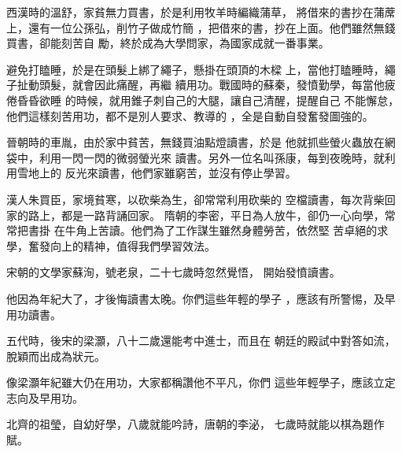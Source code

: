 \documentclass[avery5371,grid]{flashcards}
\begin{document}
{西漢時的溫舒，家貧無力買書，於是利用牧羊時編織蒲草，
將借來的書抄在蒲蓆上，還有一位公孫弘，削竹子做成竹簡
，把借來的書，抄在上面。他們雖然無錢買書，卻能刻苦自
勵，終於成為大學問家，為國家成就一番事業。} %
{} %

{避免打瞌睡，於是在頭髮上綁了繩子，懸掛在頭頂的木樑
上，當他打瞌睡時，繩子扯動頭髮，就會因此痛醒，再繼
續用功。戰國時的蘇秦，發憤勤學，每當他疲倦昏昏欲睡
的時候，就用錐子刺自己的大腿，讓自己清醒，提醒自己
不能懈怠，他們這樣刻苦用功，都不是別人要求、教導的
，全是自動自發奮發圖強的。} %
{} %

{晉朝時的車胤，由於家中貧苦，無錢買油點燈讀書，於是
他就抓些螢火蟲放在網袋中，利用一閃一閃的微弱螢光來
讀書。另外一位名叫孫康，每到夜晚時，就利用雪地上的
反光來讀書，他們家雖窮苦，並沒有停止學習。} %
{} %






{漢人朱買臣，家境貧寒，以砍柴為生，卻常常利用砍柴的
空檔讀書，每次背柴回家的路上，都是一路背誦回家。
隋朝的李密，平日為人放牛，卻仍一心向學，常常把書掛
在牛角上苦讀。他們為了工作謀生雖然身體勞苦，依然堅
苦卓絕的求學，奮發向上的精神，值得我們學習效法。} %
{} %

{宋朝的文學家蘇洵，號老泉，二十七歲時忽然覺悟，
開始發憤讀書。} %
{} %

{他因為年紀大了，才後悔讀書太晚。你們這些年輕的學子
，應該有所警惕，及早用功讀書。} %
{} %

{五代時，後宋的梁灝，八十二歲還能考中進士，而且在
朝廷的殿試中對答如流，脫穎而出成為狀元。} %
{} %

{像梁灝年紀雖大仍在用功，大家都稱讚他不平凡，你們
這些年輕學子，應該立定志向及早用功。} %
{} %

{北齊的祖瑩，自幼好學，八歲就能吟詩，唐朝的李泌，
七歲時就能以棋為題作賦。} %
{} %
\end{document}
